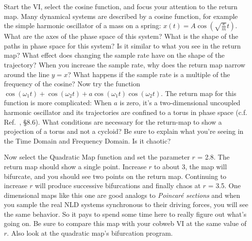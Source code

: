 \documentclass{../lab}
\begin{document}
Start the VI, select the cosine function, and focus your attention to the return map. Many dynamical systems are described by a cosine function, for example the simple harmonic oscillator of a mass on a spring: $x(t) = A \cos(\sqrt{\frac{\kappa}{m}}t)$. What are the axes of the phase space of this system? What is the shape of the paths in phase space for this system? Is it similar to what you see in the return map? What effect does changing the sample rate have on the shape of the trajectory? When you increase the sample rate, why does the return map narrow around the line $y = x$? What happens if the sample rate is a multiple of the frequency of the cosine? Now try the function $\cos {(\omega_1t)} + \cos(\omega_2t) + a \cos(\omega_1t) \cos(\omega_2t)$. The return map for this function is more complicated: When $a$ is zero, it's a two-dimensional uncoupled harmonic oscillator and its trajectories are confined to a torus in phase space (c.f. Ref.~\cite{Strogatz}, \S8.6). What conditions are necessary for the return-map to show a projection of a torus and not a cycloid? Be sure to explain what you're seeing in the Time Domain and Frequency Domain. Is it chaotic?

\newpage

Now select the Quadratic Map function and set the parameter $r$ = 2.8. The return map should show a single point. Increase $r$ to about 3, the map will bifurcate, and you should see two points on the return map. Continuing to increase $r$ will produce successive bifurcations and finally chaos at $r$ = 3.5. One dimensional maps like this one are good analogs to \emph{Poincar\'e sections} and when you sample the real NLD systems synchronous to their driving forces, you will see the same behavior. So it pays to spend some time here to really figure out what's going on. Be sure to compare this map with your cobweb VI at the same value of $r$. Also look at the quadratic map's bifurcation program.


\end{document}

